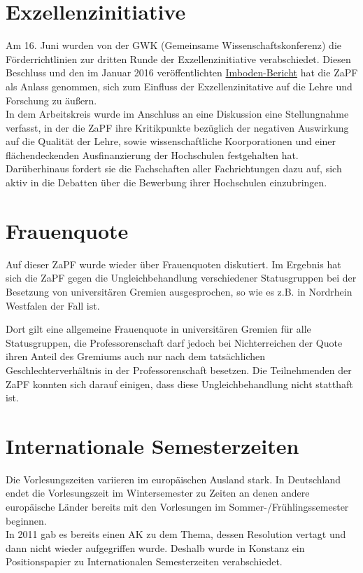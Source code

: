 \section*{Exzellenzinitiative}
Am 16. Juni wurden von der GWK (Gemeinsame Wissenschaftskonferenz) die Förderrichtlinien 
zur dritten Runde der Exzellenzinitiative verabschiedet. Diesen Beschluss und den im Januar 2016 veröffentlichten \href{http://www.gwk-bonn.de/fileadmin/Papers/Imboden-Bericht-2016.pdf}{Imboden-Bericht} hat 
die ZaPF als Anlass genommen, sich zum Einfluss der Exzellenzinitative auf die Lehre und Forschung zu äußern. \\
In dem Arbeitskreis wurde im Anschluss an eine Diskussion eine Stellungnahme verfasst, in der die ZaPF 
ihre Kritikpunkte bezüglich der negativen Auswirkung auf die Qualität der Lehre, sowie wissenschaftliche 
Koorporationen und einer flächendeckenden Ausfinanzierung der Hochschulen festgehalten hat. Darüberhinaus fordert 
sie die Fachschaften aller Fachrichtungen dazu auf, sich aktiv in die Debatten über die Bewerbung ihrer Hochschulen einzubringen. 

\section*{Frauenquote}

Auf dieser ZaPF wurde wieder über Frauenquoten diskutiert. Im Ergebnis hat sich die ZaPF 
gegen die Ungleichbehandlung verschiedener Statusgruppen bei der Besetzung von universitären 
Gremien ausgesprochen, so wie es z.B. in Nordrhein Westfalen der Fall ist. 

Dort gilt eine allgemeine Frauenquote in universitären Gremien für alle Statusgruppen, die 
Professorenschaft darf jedoch bei Nichterreichen der Quote ihren Anteil des Gremiums 
auch nur nach dem tatsächlichen Geschlechterverhältnis in der Professorenschaft besetzen. 
Die Teilnehmenden der ZaPF konnten sich darauf einigen, dass diese Ungleichbehandlung nicht statthaft ist.

\section*{Internationale Semesterzeiten}
Die Vorlesungszeiten variieren im europäischen Ausland stark. In Deutschland endet die Vorlesungszeit im 
Wintersemester zu Zeiten an denen andere europäische Länder bereits mit den Vorlesungen im Sommer-/Frühlingssemester beginnen. \\
In 2011 gab es bereits einen AK zu dem Thema, dessen Resolution vertagt und dann nicht 
wieder aufgegriffen wurde. Deshalb wurde in Konstanz ein Positionspapier zu Internationalen Semesterzeiten verabschiedet.

